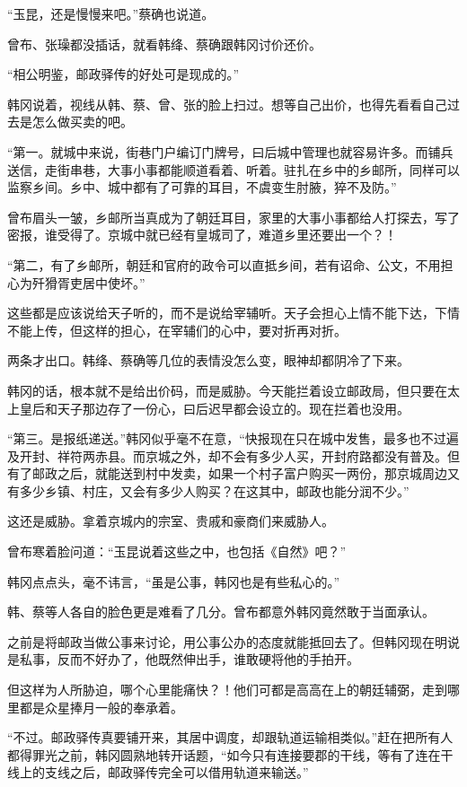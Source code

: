 “玉昆，还是慢慢来吧。”蔡确也说道。

曾布、张璪都没插话，就看韩绛、蔡确跟韩冈讨价还价。

“相公明鉴，邮政驿传的好处可是现成的。”

韩冈说着，视线从韩、蔡、曾、张的脸上扫过。想等自己出价，也得先看看自己过去是怎么做买卖的吧。

“第一。就城中来说，街巷门户编订门牌号，曰后城中管理也就容易许多。而铺兵送信，走街串巷，大事小事都能顺道看着、听着。驻扎在乡中的乡邮所，同样可以监察乡间。乡中、城中都有了可靠的耳目，不虞变生肘腋，猝不及防。”

曾布眉头一皱，乡邮所当真成为了朝廷耳目，家里的大事小事都给人打探去，写了密报，谁受得了。京城中就已经有皇城司了，难道乡里还要出一个？！

“第二，有了乡邮所，朝廷和官府的政令可以直抵乡间，若有诏命、公文，不用担心为歼猾胥吏居中使坏。”

这些都是应该说给天子听的，而不是说给宰辅听。天子会担心上情不能下达，下情不能上传，但这样的担心，在宰辅们的心中，要对折再对折。

两条才出口。韩绛、蔡确等几位的表情没怎么变，眼神却都阴冷了下来。

韩冈的话，根本就不是给出价码，而是威胁。今天能拦着设立邮政局，但只要在太上皇后和天子那边存了一份心，曰后迟早都会设立的。现在拦着也没用。

“第三。是报纸递送。”韩冈似乎毫不在意，“快报现在只在城中发售，最多也不过遍及开封、祥符两赤县。而京城之外，却不会有多少人买，开封府路都没有普及。但有了邮政之后，就能送到村中发卖，如果一个村子富户购买一两份，那京城周边又有多少乡镇、村庄，又会有多少人购买？在这其中，邮政也能分润不少。”

这还是威胁。拿着京城内的宗室、贵戚和豪商们来威胁人。

曾布寒着脸问道：“玉昆说着这些之中，也包括《自然》吧？”

韩冈点点头，毫不讳言，“虽是公事，韩冈也是有些私心的。”

韩、蔡等人各自的脸色更是难看了几分。曾布都意外韩冈竟然敢于当面承认。

之前是将邮政当做公事来讨论，用公事公办的态度就能抵回去了。但韩冈现在明说是私事，反而不好办了，他既然伸出手，谁敢硬将他的手拍开。

但这样为人所胁迫，哪个心里能痛快？！他们可都是高高在上的朝廷辅弼，走到哪里都是众星捧月一般的奉承着。

“不过。邮政驿传真要铺开来，其居中调度，却跟轨道运输相类似。”赶在把所有人都得罪光之前，韩冈圆熟地转开话题，“如今只有连接要郡的干线，等有了连在干线上的支线之后，邮政驿传完全可以借用轨道来输送。”

